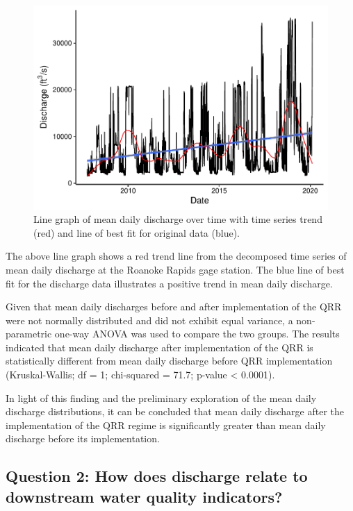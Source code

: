 \documentclass[12pt,]{article}
\begin{document}
\begin{figure}
\centering
\includegraphics{Project_Template_files/figure-latex/unnamed-chunk-7-1.pdf}
\caption{Line graph of mean daily discharge over time with time series
trend (red) and line of best fit for original data (blue).}
\end{figure}

The above line graph shows a red trend line from the decomposed time
series of mean daily discharge at the Roanoke Rapids gage station. The
blue line of best fit for the discharge data illustrates a positive
trend in mean daily discharge.

Given that mean daily discharges before and after implementation of the
QRR were not normally distributed and did not exhibit equal variance, a
non-parametric one-way ANOVA was used to compare the two groups. The
results indicated that mean daily discharge after implementation of the
QRR is statistically different from mean daily discharge before QRR
implementation (Kruskal-Wallis; df = 1; chi-squared = 71.7; p-value
\textless{} 0.0001).

In light of this finding and the preliminary exploration of the mean
daily discharge distributions, it can be concluded that mean daily
discharge after the implementation of the QRR regime is significantly
greater than mean daily discharge before its implementation.

\hypertarget{question-2-how-does-discharge-relate-to-downstream-water-quality-indicators}{%
\subsection{Question 2: How does discharge relate to downstream water
quality
indicators?}\label{question-2-how-does-discharge-relate-to-downstream-water-quality-indicators}}
\end{document}
